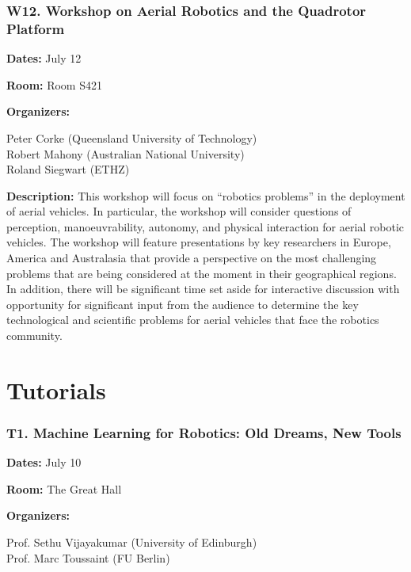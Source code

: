 \subsubsection*{ W12.    Workshop on Aerial Robotics and the Quadrotor Platform}

{\bf Dates:} July 12


{\bf Room:} Room S421

\bigskip
{\bf Organizers:}

Peter Corke (Queensland University of Technology)\\
Robert Mahony (Australian National University)\\
Roland Siegwart (ETHZ)

\bigskip
{\bf Description:}
This workshop will focus on ``robotics problems'' in the deployment of aerial vehicles.   In particular, the workshop will consider questions of perception, manoeuvrability, autonomy, and physical interaction for aerial robotic vehicles.  
The workshop will feature presentations by key researchers in Europe, America and Australasia that provide a perspective on the most challenging problems that are being considered at the moment in their geographical regions.  In addition, there will be significant time set aside for interactive discussion with opportunity for significant input from the audience to determine the key technological and scientific problems for aerial vehicles that face the robotics community.

\section*{Tutorials}
\label{tutorials}

\subsubsection*{T1. Machine Learning for Robotics: Old Dreams, New Tools}
{\bf Dates:} July 10


{\bf Room:} The Great Hall

\bigskip
{\bf Organizers:}

Prof. Sethu Vijayakumar (University of Edinburgh)\\
Prof. Marc Toussaint (FU Berlin)

